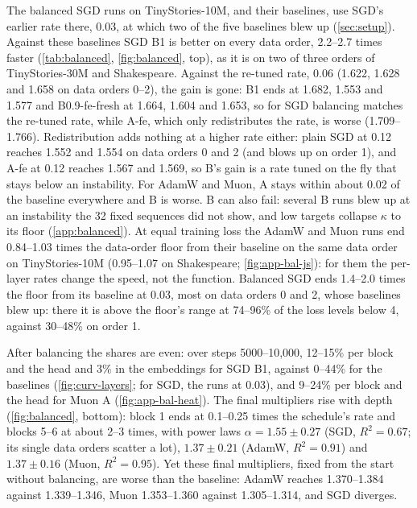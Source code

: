 \documentclass[10pt]{article}
\makeatletter
\renewcommand\paragraph{\@startsection{paragraph}{4}{\z@}{1.2ex \@plus .4ex \@minus .2ex}{-1em}{\normalfont\normalsize\bfseries}}
\makeatother
\begin{document}
\paragraph{Results.} The balanced SGD runs on TinyStories-10M, and their baselines, use SGD's earlier rate there,
0.03, at which two of the five baselines blew up (\cref{sec:setup}). Against these baselines SGD B1 is better on
every data order, 2.2--2.7 times faster (\cref{tab:balanced}, \cref{fig:balanced}, top), as it is on two of three
orders of TinyStories-30M and Shakespeare. Against the re-tuned rate, 0.06 (1.622, 1.628 and 1.658 on data orders
0--2), the gain is gone: B1 ends at 1.682, 1.553 and 1.577 and B0.9-fe-fresh at 1.664, 1.604 and 1.653, so for
SGD balancing matches the re-tuned rate, while A-fe, which only redistributes the rate, is worse (1.709--1.766).
Redistribution adds nothing at a higher rate either: plain SGD at 0.12 reaches 1.552 and 1.554 on data orders 0
and 2 (and blows up on order 1), and A-fe at 0.12 reaches 1.567 and 1.569, so B's gain is a rate tuned on the fly
that stays below an instability. For AdamW and Muon, A stays within about 0.02 of the baseline everywhere and B is
worse. B can also fail: several B runs blew up at an instability the 32 fixed
sequences did not show, and low targets collapse $\kappa$ to its floor (\cref{app:balanced}). At equal training loss the AdamW and Muon runs end 0.84--1.03 times the
data-order floor from their baseline on the same data order on TinyStories-10M (0.95--1.07 on Shakespeare;
\cref{fig:app-bal-js}): for them the per-layer rates change the speed, not the function. Balanced SGD ends 1.4--2.0
times the floor from its baseline at 0.03, most on data orders 0 and 2, whose baselines blew up: there it is above
the floor's range at 74--96\% of the loss levels below 4, against 30--48\% on order 1.

\paragraph{Where the rate goes.} After balancing the shares are even: over steps 5000--10{,}000, 12--15\% per block
and the head and 3\% in the embeddings for SGD B1, against 0--44\% for the baselines (\cref{fig:curv-layers};
for SGD, the runs at 0.03), and
9--24\% per block and the head for Muon A (\cref{fig:app-bal-heat}). The final multipliers rise with depth
(\cref{fig:balanced}, bottom): block 1 ends at 0.1--0.25 times the schedule's rate and blocks 5--6 at about 2--3
times, with power laws $\alpha=1.55\pm0.27$ (SGD, $R^2=0.67$; its single data orders scatter a lot), $1.37\pm0.21$
(AdamW, $R^2=0.91$) and $1.37\pm0.16$ (Muon, $R^2=0.95$). Yet these final multipliers, fixed from the start without
balancing, are worse than the baseline: AdamW reaches 1.370--1.384 against 1.339--1.346, Muon 1.353--1.360 against
1.305--1.314, and SGD diverges.
\end{document}
